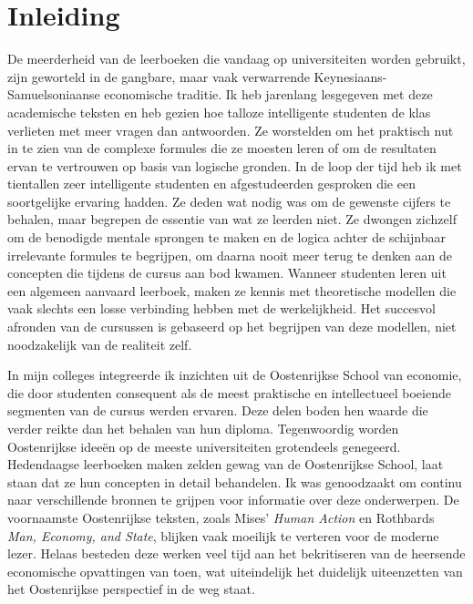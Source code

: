 \chapter{Inleiding}
De meerderheid van de leerboeken die vandaag op universiteiten worden gebruikt, zijn geworteld in de gangbare, maar vaak verwarrende Keynesiaans-Samuel\-soniaanse economische traditie. Ik heb jarenlang lesgegeven met deze academische teksten en heb gezien hoe talloze intelligente studenten de klas verlieten met meer vragen dan antwoorden. Ze worstelden om het praktisch nut in te zien van de complexe formules die ze moesten leren of om de resultaten ervan te vertrouwen op basis van logische gronden. In de loop der tijd heb ik met tientallen zeer intelligente studenten en afgestudeerden gesproken die een soortgelijke ervaring hadden. Ze deden wat nodig was om de gewenste cijfers te behalen, maar begrepen de essentie van wat ze leerden niet. Ze dwongen zichzelf om de benodigde mentale sprongen te maken en de logica achter de schijnbaar irrelevante formules te begrijpen, om daarna nooit meer terug te denken aan de concepten die tijdens de cursus aan bod kwamen. Wanneer studenten leren uit een algemeen aanvaard leerboek, maken ze kennis met theoretische modellen die vaak slechts een losse verbinding hebben met de werkelijkheid. Het succesvol afronden van de cursussen is gebaseerd op het begrijpen van deze modellen, niet noodzakelijk van de realiteit zelf.

In mijn colleges integreerde ik inzichten uit de Oostenrijkse School van economie, die door studenten consequent als de meest praktische en intellectueel boeiende segmenten van de cursus werden ervaren. Deze delen boden hen waarde die verder reikte dan het behalen van hun diploma. Tegenwoordig worden Oostenrijkse ideeën op de meeste universiteiten grotendeels genegeerd. Hedendaagse leerboeken maken zelden gewag van de Oostenrijkse School, laat staan dat ze hun concepten in detail behandelen. Ik was genoodzaakt om continu naar verschillende bronnen te grijpen voor informatie over deze onderwerpen. De voornaamste Oostenrijkse teksten, zoals Mises' \textit{Human Action} en Rothbards \textit{Man, Economy, and State}, blijken vaak moeilijk te verteren voor de moderne lezer. Helaas besteden deze werken veel tijd aan het bekritiseren van de heersende economische opvattingen van toen, wat uiteindelijk het duidelijk uiteenzetten van het Oostenrijkse perspectief in de weg staat.

